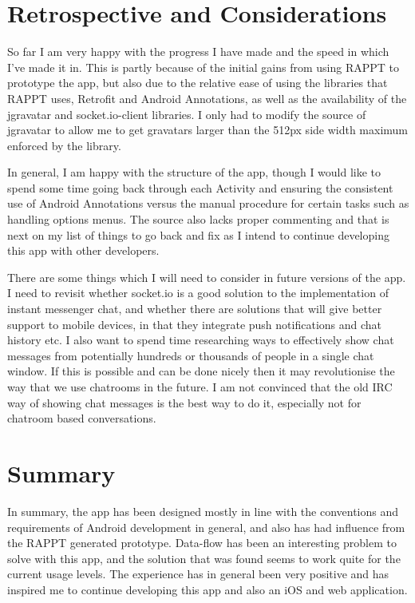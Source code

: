 \documentclass[11pt,english,numbers=endperiod,parskip=half]{scrartcl}
\begin{document}
\section{Retrospective and Considerations}
  So far I am very happy with the progress I have made and the speed in which
  I've made it in. This is partly because of the initial gains from using RAPPT
  to prototype the app, but also due to the relative ease of using the libraries
  that RAPPT uses, Retrofit and Android Annotations, as well as the availability
  of the jgravatar and socket.io-client libraries. I only had to modify the source
  of jgravatar to allow me to get gravatars larger than the 512px side width
  maximum enforced by the library.

  In general, I am happy with the structure of the app, though I would like to
  spend some time going back through each Activity and ensuring the consistent
  use of Android Annotations versus the manual procedure for certain tasks such
  as handling options menus. The source also lacks proper commenting and that
  is next on my list of things to go back and fix as I intend to continue
  developing this app with other developers.

  There are some things which I will need to consider in future versions of
  the app. I need to revisit whether socket.io is a good solution to the
  implementation of instant messenger chat, and whether there are
  solutions that will give better support to mobile devices, in that they
  integrate push notifications and chat history etc. I also want to spend time
  researching ways to effectively show chat messages from potentially hundreds
  or thousands of people in a single chat window. If this is possible and can
  be done nicely then it may revolutionise the way that we use chatrooms in
  the future. I am not convinced that the old IRC way of showing chat messages
  is the best way to do it, especially not for chatroom based conversations.
\section{Summary}
  In summary, the app has been designed mostly in line with the conventions
  and requirements of Android development in general, and also has had influence
  from the RAPPT generated prototype. Data-flow has been an interesting problem
  to solve with this app, and the solution that was found seems to work quite
  for the current usage levels. The experience has in general been very positive
  and has inspired me to continue developing this app and also an iOS and web
  application.
\end{document}
